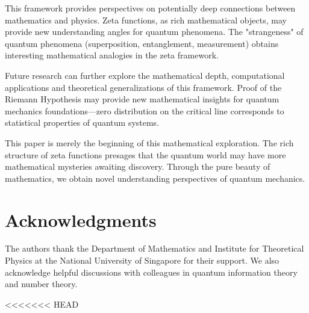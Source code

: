\documentclass[11pt]{article}
\theoremstyle{plain}
\theoremstyle{definition}
\theoremstyle{remark}
\begin{document}
This framework provides perspectives on potentially deep connections between mathematics and physics. Zeta functions, as rich mathematical objects, may provide new understanding angles for quantum phenomena. The "strangeness" of quantum phenomena (superposition, entanglement, measurement) obtains interesting mathematical analogies in the zeta framework.

Future research can further explore the mathematical depth, computational applications and theoretical generalizations of this framework. Proof of the Riemann Hypothesis may provide new mathematical insights for quantum mechanics foundations—zero distribution on the critical line corresponds to statistical properties of quantum systems.

This paper is merely the beginning of this mathematical exploration. The rich structure of zeta functions presages that the quantum world may have more mathematical mysteries awaiting discovery. Through the pure beauty of mathematics, we obtain novel understanding perspectives of quantum mechanics.

\section*{Acknowledgments}

The authors thank the Department of Mathematics and Institute for Theoretical Physics at the National University of Singapore for their support. We also acknowledge helpful discussions with colleagues in quantum information theory and number theory.


<<<<<<< HEAD
\end{document}
